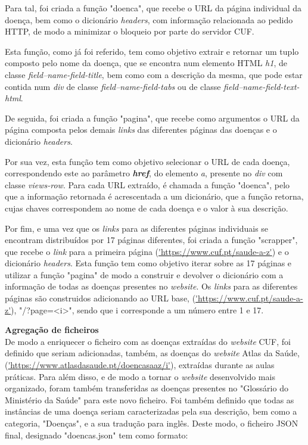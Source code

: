 Para tal, foi criada a função "doenca", que recebe o URL da página individual da doença, bem como o dicionário \textit{headers}, com informação relacionada ao pedido HTTP, de modo a minimizar o bloqueio por parte do servidor CUF.

Esta função, como já foi referido, tem como objetivo extrair e retornar um tuplo composto pelo nome da doença, que se encontra num elemento HTML \textit{h1}, de classe \textit{field--name-field-title}, bem como com a descrição da mesma, que pode estar contida num \textit{div} de classe \textit{field--name-field-tabs} ou de classe \textit{field--name-field-text-html}.

De seguida, foi criada a função "pagina", que recebe como argumentos o URL da página composta pelos demais \textit{links} das diferentes páginas das doenças e o dicionário \textit{headers}.

Por sua vez, esta função tem como objetivo selecionar o URL de cada doença, correspondendo este ao parâmetro \textit{\textbf{href}}, do elemento \textit{a}, presente no \textit{div} com classe \textit{views-row}. Para cada URL extraído, é chamada a função "doenca", pelo que a informação retornada é acrescentada a um dicionário, que a função retorna, cujas chaves correspondem ao nome de cada doença e o valor à sua descrição.

Por fim, e uma vez que os \textit{links} para as diferentes páginas individuais se encontram distribuídos por 17 páginas diferentes, foi criada a função "scrapper", que recebe o \textit{link} para a primeira página (\url{'https://www.cuf.pt/saude-a-z'}) e o dicionário \textit{headers}.
Esta função tem como objetivo iterar sobre as 17 páginas e utilizar a função "pagina" de modo a construir e devolver o dicionário com a informação de todas as doenças presentes no \textit{website}. Os \textit{links} para as diferentes páginas são construidos adicionando ao URL base, (\url{'https://www.cuf.pt/saude-a-z'}), "/?page=<i>", sendo que i corresponde a um número entre 1 e 17.

\textbf{Agregação de ficheiros}\\
De modo a enriquecer o ficheiro com as doenças extraídas do \textit{website} CUF, foi definido que seriam adicionadas, também, as doenças do \textit{website} Atlas da Saúde,(\url{'https://www.atlasdasaude.pt/doencasaaz/i'}), extraídas durante as aulas práticas. Para além disso, e de modo a tornar o \textit{website} desenvolvido mais organizado, foram também transferidas as doenças presentes no "Glossário do Ministério da Saúde" para este novo ficheiro. 
Foi também definido que todas as instâncias de uma doença seriam caracterizadas pela sua descrição, bem como a categoria, "Doenças", e a sua tradução para inglês. Deste modo, o ficheiro JSON final, designado "doencas.json" tem como formato:\\


